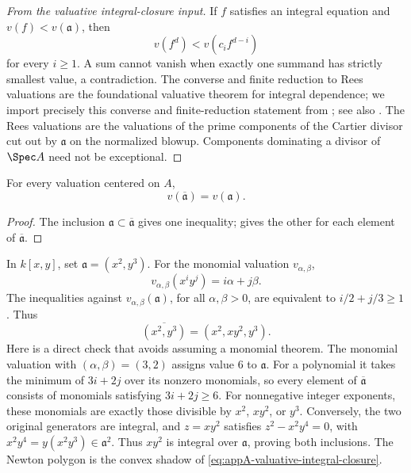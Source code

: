 \begin{proof}[From the valuative integral-closure input]
If \(f\) satisfies an integral equation and
\(v(f)<v(\mathfrak a)\), then
\[
 v(f^d)<v(c_if^{d-i})
\]
for every \(i\geq1\).  A sum cannot vanish when exactly one summand has
strictly smallest value, a contradiction.  The converse and finite
reduction to Rees valuations are the foundational valuative theorem for
integral dependence; we import precisely this converse and finite-reduction
statement from \cite[Theorem~6.8.3 and Theorem~10.2.2]{SwansonHuneke2006};
see also \cite[Chapter~VI]{ZariskiSamuelII}.  The Rees valuations
are the valuations of the prime components of the Cartier divisor cut out
by \(\mathfrak a\) on the normalized blowup.  Components dominating a
divisor of \(\Spec A\) need not be exceptional.
\end{proof}

\begin{corollary}\label{cor:appA-integral-closure-values}
For every valuation centered on \(A\),
\[
 v(\overline{\mathfrak a})=v(\mathfrak a).
\]
\end{corollary}

\begin{proof}
The inclusion \(\mathfrak a\subset\overline{\mathfrak a}\) gives one
inequality;  gives the
other for each element of \(\overline{\mathfrak a}\).
\end{proof}

\begin{example}
\label{ex:appA-monomial-integral-closure}
In \(k[x,y]\), set \(\mathfrak a=(x^2,y^3)\).
For the monomial valuation \(v_{\alpha,\beta}\),
\[
 v_{\alpha,\beta}(x^iy^j)=i\alpha+j\beta.
\]
The inequalities against \(v_{\alpha,\beta}(\mathfrak a)\), for all
\(\alpha,\beta>0\), are equivalent to \(i/2+j/3\geq1\).  Thus
\[
 \overline{(x^2,y^3)}=(x^2,xy^2,y^3).
\]
Here is a direct check that avoids assuming a monomial theorem.  The
monomial valuation with \((\alpha,\beta)=(3,2)\) assigns value \(6\) to
\(\mathfrak a\).  For a polynomial it takes the minimum of \(3i+2j\)
over its nonzero monomials, so every element of
\(\overline{\mathfrak a}\) consists of monomials satisfying
\(3i+2j\geq6\).  For nonnegative integer exponents, these monomials
are exactly those divisible by \(x^2\), \(xy^2\), or \(y^3\).
Conversely, the two original generators are integral, and \(z=xy^2\)
satisfies \(z^2-x^2y^4=0\), with
\(x^2y^4=y(x^2y^3)\in\mathfrak a^2\).  Thus \(xy^2\) is integral
over \(\mathfrak a\), proving both inclusions.  The Newton polygon is
the convex shadow of \eqref{eq:appA-valuative-integral-closure}.
\end{example}

